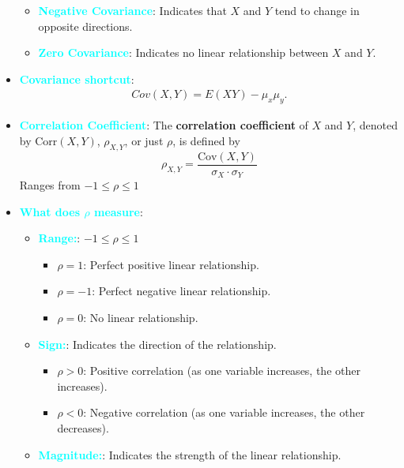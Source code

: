 \documentclass{report}
\begin{document}
\begin{itemize}
\begin{itemize}
                \item \textbf{\textcolor{cyan}{Negative Covariance}}: Indicates that \( X \) and \( Y \) tend to change in opposite directions. 
                \item \textbf{\textcolor{cyan}{Zero Covariance}}: Indicates no linear relationship between \( X \) and \( Y \). 
            \end{itemize}
        \item \textbf{\textcolor{cyan}{Covariance shortcut}}:
            \begin{align*}
                Cov(X,Y) = E(XY) - \mu_{x} \mu_{y}
            .\end{align*}

        \item \textbf{\textcolor{cyan}{Correlation Coefficient}}:
            The \textbf{correlation coefficient} of \(X\) and \(Y\), denoted by \(\text{Corr}(X, Y)\), \(\rho_{X,Y}\), or just \(\rho\), is defined by
            \[
                \rho_{X,Y} = \frac{\text{Cov}(X, Y)}{\sigma_X \cdot \sigma_Y}
            \]
            Ranges from $-1 \leq \rho \leq 1 $
        \item \textbf{\textcolor{cyan}{What does $\rho$ measure}}:
            \begin{itemize}
                \item \textbf{\textcolor{cyan}{Range:}}: \(-1 \leq \rho \leq 1\)
                    \begin{itemize}
                        \item \(\rho = 1\): Perfect positive linear relationship.
                        \item \(\rho = -1\): Perfect negative linear relationship.
                        \item \(\rho = 0\): No linear relationship.
                    \end{itemize}
                \item \textbf{\textcolor{cyan}{Sign:}}: Indicates the direction of the relationship.
                    \begin{itemize}
                        \item \(\rho > 0\): Positive correlation (as one variable increases, the other increases).
                        \item \(\rho < 0\): Negative correlation (as one variable increases, the other decreases).
                    \end{itemize}
                \item \textbf{\textcolor{cyan}{Magnitude:}}: Indicates the strength of the linear relationship.

\end{itemize}
\end{itemize}
\end{document}
